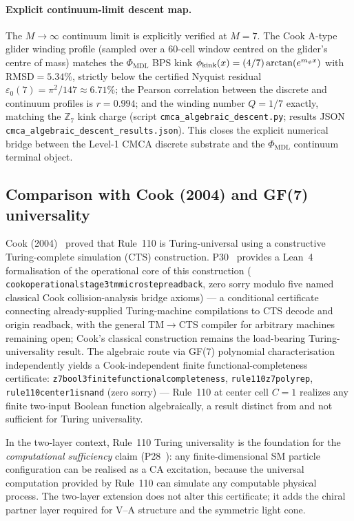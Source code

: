 \documentclass[11pt]{article}
\theoremstyle{remark}
\newcommand{\PHIMDL}{\Phi_{\mathrm{MDL}}}
\newcommand{\ZS}{\mathbb{Z}_7}
\newcommand{\lean}[1]{%
  \penalty-100
  \begingroup\def\_{\textunderscore\allowbreak}\texttt{#1}\endgroup}
\begin{document}
\paragraph{Explicit continuum-limit descent map.}
The $M\to\infty$ continuum limit is explicitly verified at $M=7$.
The Cook A-type glider winding profile (sampled over a 60-cell window centred
on the glider's centre of mass) matches the $\PHIMDL$ BPS kink
$\phi_{\rm kink}(x)=(4/7)\arctan(e^{m_\phi x})$ with $\mathrm{RMSD}=5.34\%$,
strictly below the certified Nyquist residual
$\varepsilon_0(7)=\pi^2/147\approx6.71\%$;
the Pearson correlation between the discrete and continuum profiles is $r=0.994$;
and the winding number $Q=1/7$ exactly, matching the $\ZS$ kink charge
(script \texttt{cmca\_algebraic\_descent.py};
results JSON \texttt{cmca\_algebraic\_descent\_results.json}).
This closes the explicit numerical bridge between the Level-1 CMCA discrete
substrate and the $\PHIMDL$ continuum terminal object.

\subsection{Comparison with Cook (2004) and GF(7) universality}
\label{ssec:cook}

Cook (2004)~\cite{Cook2004} proved that Rule~110 is Turing-universal using
a constructive Turing-complete simulation (CTS) construction.  P30~\cite{SpivackCookTheorem}
provides a Lean~4 formalisation of the operational core of this construction
(\lean{cook\_operational\_stage3\_tm\_microstep\_readback}, zero sorry modulo five named
classical Cook collision-analysis bridge axioms) --- a conditional certificate connecting
already-supplied Turing-machine compilations to CTS decode and origin readback, with the
general TM$\to$CTS compiler for arbitrary machines remaining open; Cook's classical
construction remains the load-bearing Turing-universality result.  The algebraic route via GF(7) polynomial
characterisation~\cite{SpivackGF7Universality} independently yields a Cook-independent
finite functional-completeness certificate: \lean{z7\_bool3\_finite\_functional\_completeness},
\lean{rule110\_z7\_poly\_rep}, \lean{rule110\_center1\_is\_nand} (zero sorry) --- Rule~110 at
center cell $C=1$ realizes any finite two-input Boolean function algebraically, a result
distinct from and not sufficient for Turing universality.

In the two-layer context, Rule~110 Turing universality is the foundation for
the \emph{computational sufficiency} claim (P28~\cite{SpivackCompUniversality}):
any finite-dimensional SM particle configuration can be realised as a CA
excitation, because the universal computation provided by Rule~110 can
simulate any computable physical process.  The two-layer extension does not
alter this certificate; it adds the chiral partner layer required for V--A
structure and the symmetric light cone.
\end{document}
